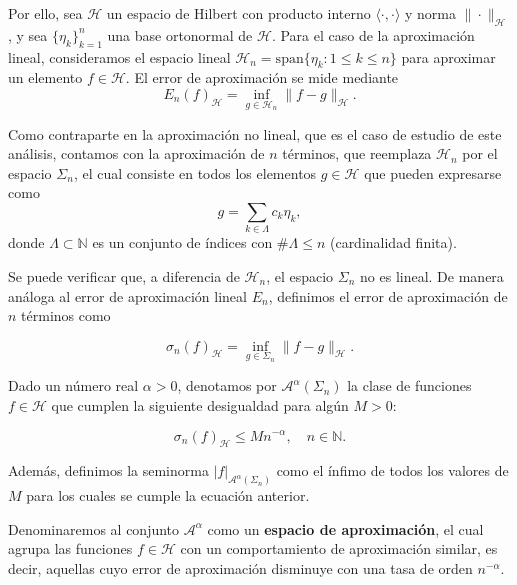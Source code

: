 Por ello, sea $\mathcal{H}$ un espacio de Hilbert con producto interno $\langle \cdot, \cdot \rangle$ y norma $\|\cdot\|_{\mathcal{H}}$, y sea $\{\eta_k\}_{k=1}^{n}$ una base ortonormal de $\mathcal{H}$. Para el caso de la aproximación lineal, consideramos el espacio lineal $\mathcal{H}_n = \text{span}\{\eta_k : 1 \leq k \leq n\}$ para aproximar un elemento $f \in \mathcal{H}$. El error de aproximación se mide mediante
\[
    E_n(f)_{\mathcal{H}} = \inf_{g \in \mathcal{H}_n} \| f - g \|_{\mathcal{H}}.
\]

Como contraparte en la aproximación no lineal, que es el caso de estudio de este análisis, contamos con la aproximación de $n$ términos, que reemplaza $\mathcal{H}_n$ por el espacio $\Sigma_n$, el cual consiste en todos los elementos $g \in \mathcal{H}$ que pueden expresarse como
\[
    g = \sum_{k \in \Lambda} c_k \eta_k,
\]
donde $\Lambda \subset \mathbb{N}$ es un conjunto de índices con $\# \Lambda \leq n$ (cardinalidad finita).\newline

Se puede verificar que, a diferencia de $\mathcal{H}_n$, el espacio $\Sigma_n$ no es lineal. De manera análoga al error de aproximación lineal $E_n$, definimos el error de aproximación de $n$ términos como

\[
    \sigma_n(f)_{\mathcal{H}} = \inf_{g \in \Sigma_n} \| f - g \|_{\mathcal{H}}.
\]

\begin{definicion}
    Dado un número real $\alpha > 0$, denotamos por $\mathcal{A}^{\alpha}(\Sigma_n)$ la clase de funciones $f \in \mathcal{H}$ que cumplen la siguiente desigualdad para algún $M > 0$:

    \begin{equation}\label{eq:clases-error}
        \sigma_n(f)_{\mathcal{H}} \leq M n^{-\alpha}, \quad n \in \mathbb{N}.
    \end{equation}

    Además, definimos la seminorma $|f|_{\mathcal{A}^{\alpha}(\Sigma_n)}$ como el ínfimo de todos los valores de $M$ para los cuales se cumple la ecuación anterior.
\end{definicion}

Denominaremos al conjunto $\mathcal{A}^{\alpha}$ como un \textbf{espacio de aproximación}, el cual agrupa las funciones $f \in \mathcal{H}$ con un comportamiento de aproximación similar, es decir, aquellas cuyo error de aproximación disminuye con una tasa de orden $n^{-\alpha}$.\newline

